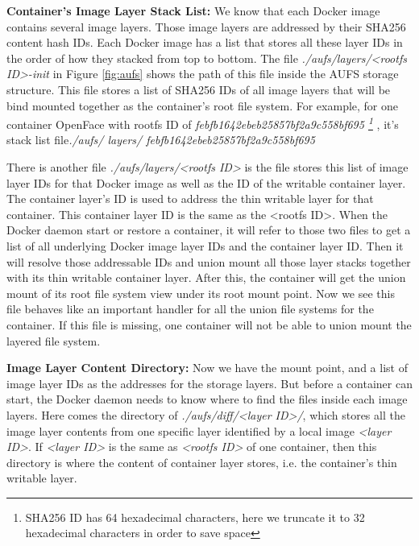 \textbf{Container's Image Layer Stack List:} We know that each Docker image contains several image layers. Those image layers are addressed by their SHA256 content hash IDs. Each Docker image has a list that stores all these layer IDs in the order of how they stacked from top to bottom.
The file \textit{./aufs/layers/<rootfs ID>-init}  in Figure \ref{fig:aufs} shows the path of this file inside the AUFS storage structure. This file stores a list of SHA256 IDs of all image layers that will be bind mounted together as the container's root file system. For example, for one container OpenFace with rootfs ID of 
\textit{
febfb1642ebeb25857bf2a9c558bf695
\footnote{SHA256 ID has 64 hexadecimal characters, here we truncate it to 32 hexadecimal characters in order to save space}
}, it's stack list file\textit{./aufs/ layers/ febfb1642ebeb25857bf2a9c558bf695}


There is another file \textit{./aufs/layers/<rootfs ID>} is the file stores this list of image layer IDs for that Docker image as well as the ID of the writable container layer.  The container layer's ID is used to address the thin writable layer for that container. This container layer ID is the same as the <rootfs ID>. 
When the Docker daemon start or restore a container, it will refer to those two files to get a list of all underlying Docker image layer IDs and the container layer ID. Then it will resolve those addressable IDs and union mount all those layer stacks together with its thin writable container layer. After this, the container will get the union mount of its root file system view under its root mount point. 
Now we see this file behaves like an important handler for all the union file systems for the container. If this file is missing, one container will not be able to union mount the layered file system.


\textbf{Image Layer Content Directory:} Now we have the mount point, and a list of image layer IDs as the addresses for the storage layers. But before a container can start, the Docker daemon needs to know where to find the files inside each image layers. Here comes the directory of
 \textit{./aufs/diff/<layer ID>/}, which stores all the image layer contents from one specific layer identified by a local image \textit{<layer ID>}. If \textit{<layer ID>} is the same as \textit{<rootfs ID>} of one container, then this directory is where the content of container layer stores, i.e. the container's thin writable layer. 

